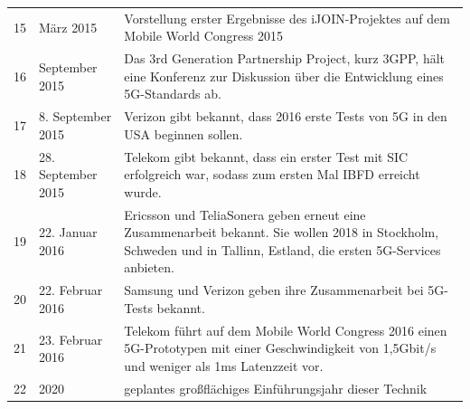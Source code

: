 \begin{tabular}{p{1 cm}p{3 cm}p{13.55 cm}}
	15 & März 2015 & Vorstellung erster Ergebnisse des iJOIN-Projektes auf dem Mobile World Congress 2015 \\
	16 & September 2015 & Das 3rd Generation Partnership Project, kurz 3GPP, hält eine Konferenz zur Diskussion über die Entwicklung eines 5G-Standards ab. \\
	17 & 8. September 2015 & Verizon gibt bekannt, dass 2016 erste Tests von 5G in den USA beginnen sollen. \\
	18 & 28. September 2015 & Telekom gibt bekannt, dass ein erster Test mit SIC erfolgreich war, sodass zum ersten Mal IBFD erreicht wurde. \cite{5g.2} \\
	19 & 22. Januar 2016 & Ericsson und TeliaSonera geben erneut eine Zusammenarbeit bekannt. Sie wollen 2018 in Stockholm, Schweden und in Tallinn, Estland, die ersten 5G-Services anbieten. \\
	20 & 22. Februar 2016 & Samsung und Verizon geben ihre Zusammenarbeit bei 5G-Tests bekannt. \\
	21 & 23. Februar 2016 & Telekom führt auf dem Mobile World Congress 2016 einen 5G-Prototypen mit einer Geschwindigkeit von 1,5Gbit/s und weniger als 1ms Latenzzeit vor. \cite{5g.4}\\
	22 & 2020 & geplantes großflächiges Einführungsjahr dieser Technik \\
\end{tabular}
\par
